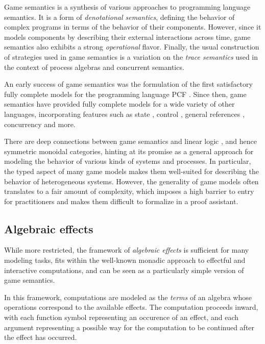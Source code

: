 \documentclass[11pt,oneside,draft]{book}
\theoremstyle{definition}
\begin{document}
Game semantics is a synthesis
of various approaches to programming language semantics.
It is a form of \emph{denotational semantics},
defining the behavior of complex programs
in terms of the behavior of their components.
However,
since it models components
by describing their external interactions across time,
game semantics also exhibits a strong \emph{operational} flavor.
Finally,
the usual construction of strategies used in game semantics
is a variation on the \emph{trace semantics}
used in the context of process algebras
and concurrent semantics.

An early success of game semantics
was the formulation of the first satisfactory
fully complete models for
the programming language PCF \citep{pcfajm,pcfho}.
Since then,
game semantics have provided fully complete models
for a wide variety of other languages,
incorporating features such as
state \citep{gsia},
control \citep{gscontrol},
general references \citep{gsgr},
concurrency \citep{gsconcur}
and more.

There are deep connections between
game semantics and linear logic \citep{gsnecessary},
and hence symmetric monoidal categories,
hinting at its promise
as a general approach for modeling the behavior of
various kinds of systems and processes.
In particular,
the typed aspect of many game models
makes them well-suited for
describing the behavior of heterogeneous systems.
However,
the generality of game models
often translates to a fair amount of complexity,
which imposes a high barrier to entry for practitioners
and makes them difficult to formalize in a proof assistant.


\subsection{Algebraic effects} %

While more restricted,
the framework of \emph{algebraic effects} \citep{effadq}
is sufficient for many modeling tasks,
fits within the well-known monadic approach
to effectful and interactive computations,
and can be seen as a particularly simple version
of game semantics.

In this framework,
computations are modeled as the \emph{terms}
of an algebra whose operations correspond to
the available effects. %
The computation proceeds inward,
with each function symbol representing an occurence of an effect,
and each argument representing a possible way
for the computation to be continued
after the effect has occurred.
\end{document}
